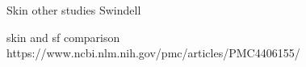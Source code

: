 


Skin other studies Swindell



 
skin and sf comparison
https://www.ncbi.nlm.nih.gov/pmc/articles/PMC4406155/

